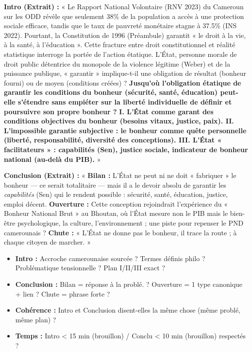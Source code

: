 \documentclass[11pt]{article}
\begin{document}
\begin{corrige}
\textbf{Intro (Extrait) :} « Le Rapport National Volontaire (RNV 2023) du Cameroun sur les ODD révèle que seulement \num{38}\% de la population a accès à une protection sociale efficace, tandis que le taux de pauvreté monétaire stagne à \num{37,5}\% (INS 2022). Pourtant, la Constitution de 1996 (Préambule) garantit « le droit à la vie, à la santé, à l'éducation ». Cette fracture entre droit constitutionnel et réalité statistique interroge la portée de l'action étatique. L'État, personne morale de droit public détentrice du monopole de la violence légitime (Weber) et de la puissance publique, « garantir » implique-t-il une obligation de résultat (bonheur fourni) ou de moyen (conditions créées) ? \textbf{Jusqu'où l'obligation étatique de garantir les conditions du bonheur (sécurité, santé, éducation) peut-elle s'étendre sans empiéter sur la liberté individuelle de définir et poursuivre son propre bonheur ?} \textbf{I. L'État comme garant des conditions objectives du bonheur (besoins vitaux, justice, paix). II. L'impossible garantie subjective : le bonheur comme quête personnelle (liberté, responsabilité, diversité des conceptions). III. L'État « facilitateurs » : capabilités (Sen), justice sociale, indicateur de bonheur national (au-delà du PIB).} »

\textbf{Conclusion (Extrait) :} « \textbf{Bilan :} L'État ne peut ni ne doit « fabriquer » le bonheur — ce serait totalitaire — mais il a le devoir absolu de garantir les \textit{capabilités} (Sen) qui le rendent possible : sécurité, santé, éducation, justice, emploi décent. \textbf{Ouverture :} Cette conception rejoindrait l'expérience du « Bonheur National Brut » au Bhoutan, où l'État mesure non le PIB mais le bien-être psychologique, la culture, l'environnement ; une piste pour repenser le PND camerounais ? \textbf{Chute :} « L'État ne donne pas le bonheur, il trace la route ; à chaque citoyen de marcher. » 
\end{corrige}

\begin{aretenir}
\begin{itemize}
    \item [ ] \textbf{Intro :} Accroche camerounaise sourcée ? Termes définis philo ? Problématique tensionnelle ? Plan I/II/III exact ?
    \item [ ] \textbf{Conclusion :} Bilan = réponse à la problé. ? Ouverture = 1 type canonique + lien ? Chute = phrase forte ?
    \item [ ] \textbf{Cohérence :} Intro et Conclusion disent-elles la même chose (même problé, même plan) ?
    \item [ ] \textbf{Temps :} Intro < 15 min (brouillon) / Conclu < 10 min (brouillon) respectés ?
\end{itemize}
\end{aretenir}
\end{document}
